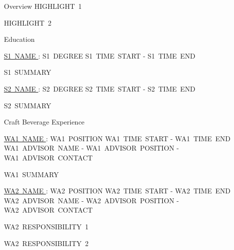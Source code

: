 \documentclass{resume} %
\begin{document}
  

  \begin{rSection}{Overview}
    HIGHLIGHT~1

    HIGHLIGHT~2
  \end{rSection}

  \begin{rSection}{Education}

    \begin{rSubsection}{\underline{S1~NAME }: S1~DEGREE }{ S1~TIME~START - S1~TIME~END }{}

      \item S1~SUMMARY

    \end{rSubsection}
    
    \begin{rSubsection}{\underline{S2~NAME }: S2~DEGREE }{ S2~TIME~START - S2~TIME~END }{}

      \item S2~SUMMARY

    \end{rSubsection}

  \end{rSection}

  \begin{rSection}{Craft Beverage Experience}

    \begin{rSubsection}{\underline{WA1~NAME }: WA1~POSITION }{ WA1~TIME~START - WA1~TIME~END }{ WA1~ADVISOR~NAME - WA1~ADVISOR~POSITION - WA1~ADVISOR~CONTACT }

      \item WA1~SUMMARY

  

    \end{rSubsection}

    \begin{rSubsection}{\underline{WA2~NAME }: WA2~POSITION }{ WA2~TIME~START - WA2~TIME~END }{ WA2~ADVISOR~NAME - WA2~ADVISOR~POSITION - WA2~ADVISOR~CONTACT }


      \item WA2~RESPONSIBILITY~1

      \item WA2~RESPONSIBILITY~2
      

    \end{rSubsection}

  \end{rSection}
\end{document}
